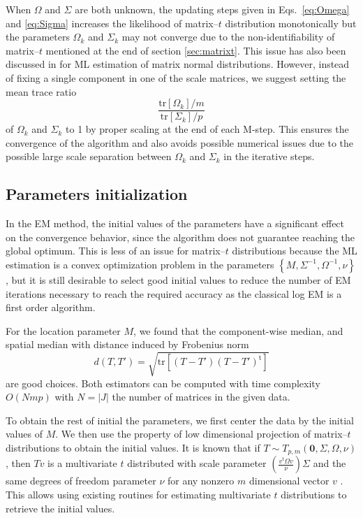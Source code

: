 \documentclass[english,listof=totoc]{scrartcl}
\begin{document}
When $\Omega$ and $\Sigma$ are both unknown, the updating steps given
in Eqs.~\eqref{eq:Omega} and \eqref{eq:Sigma} increases the likelihood
of matrix--$t$ distribution monotonically but the parameters
$\Omega_k$ and $\Sigma_k$ may not converge due to the
non-identifiability of matrix--$t$ mentioned at the end of section
\ref{sec:matrixt}. This issue has also been discussed in
\citep{2013arXiv1309.6609G} for ML estimation of matrix normal
distributions. However, instead of fixing a single component in one of
the scale matrices, we suggest setting the mean trace ratio
\begin{equation}
\frac{\textrm{tr}[\Omega_k]/m}{\textrm{tr}[\Sigma_k]/p}
\end{equation}
of $\Omega_k$ and $\Sigma_k$ to 1 by proper scaling at the end of each
M-step. This ensures the convergence of the algorithm and also avoids
possible numerical issues due to the possible large scale separation
between $\Omega_k$ and $\Sigma_k$ in the iterative steps.

\subsection{Parameters initialization}

In the EM method, the initial values of the parameters have
a significant effect on the convergence behavior, since the algorithm
does not guarantee reaching the global optimum. This is less of an
issue for matrix--$t$ distributions because the ML estimation is
a convex optimization problem in the parameters
$\left\{M,\Sigma^{-1},\Omega^{-1},\nu\right\}$, but it is still
desirable to select good initial values to reduce the number of EM
iterations necessary to reach the required accuracy as the classical
log EM is a first order algorithm.

For the location parameter $M$, we found that the component-wise
median, and spatial
median \citep{Vardi15022000} with distance induced by Frobenius norm
\begin{equation}
d(T,T')=\sqrt{\textrm{tr}\left[(T-T')(T-T')^{\textrm{t}}\right]}
\end{equation}
are good choices. Both estimators can be computed with time complexity
$O(Nmp)$ with $N=|J|$ the number of matrices in the given data.

To obtain the rest of initial the parameters, we first center the data
by the initial values of $M$. We then  use the property of low
dimensional projection of matrix--$t$ distributions to obtain the
initial values.  It is known that if $T\sim
T_{p,m}(\mathbf{0},\Sigma,\Omega,\nu)$, then $Tv$ is a multivariate
$t$ distributed with scale parameter $\left(\frac{v^{\textrm{t}}\Omega
v}{\nu}\right)\Sigma$ and the same degrees of freedom parameter $\nu$
for any nonzero $m$ dimensional vector $v$ \citep{gupta1999matrix}.
This allows using existing routines for estimating multivariate $t$
distributions to retrieve the initial values.
\end{document}

